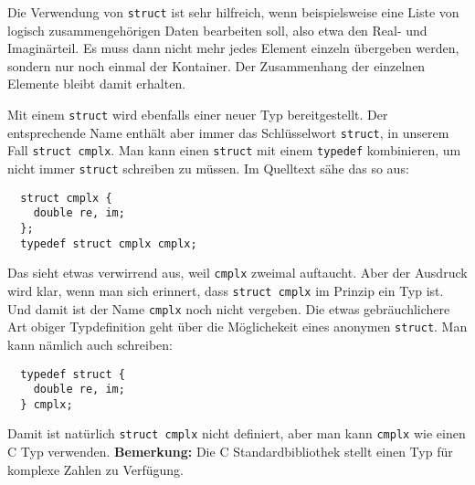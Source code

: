Die Verwendung von \verb|struct| ist sehr hilfreich, wenn beispielsweise eine Liste von logisch zusammengehörigen Daten bearbeiten soll, also etwa den Real- und Imaginärteil.
Es muss dann nicht mehr jedes Element einzeln übergeben werden, sondern nur noch einmal der Kontainer.
Der Zusammenhang der einzelnen Elemente bleibt damit erhalten.

Mit einem \verb|struct| wird ebenfalls einer neuer Typ bereitgestellt.
Der entsprechende Name enthält aber immer das Schlüsselwort \verb|struct|, in unserem Fall \verb|struct cmplx|. 
Man kann einen \verb|struct| mit einem \verb|typedef| kombinieren, um nicht immer \verb|struct| schreiben zu müssen.
Im Quelltext sähe das so aus:
\begin{lstlisting}
  struct cmplx {
    double re, im;
  };
  typedef struct cmplx cmplx;
\end{lstlisting}
Das sieht etwas verwirrend aus, weil \verb|cmplx| zweimal auftaucht.
Aber der Ausdruck wird klar, wenn man sich erinnert, dass \verb|struct cmplx| im Prinzip ein Typ ist.
Und damit ist der Name \verb|cmplx| noch nicht vergeben.
Die etwas gebräuchlichere Art obiger Typdefinition geht über die Möglichekeit eines anonymen \verb|struct|.
Man kann nämlich auch schreiben:
\begin{lstlisting}
  typedef struct {
    double re, im;
  } cmplx;
\end{lstlisting}
Damit ist natürlich \verb|struct cmplx| nicht definiert, aber man kann \verb|cmplx| wie einen C Typ verwenden.
\textbf{Bemerkung:} Die C Standardbibliothek stellt einen Typ für komplexe Zahlen zu Verfügung.

